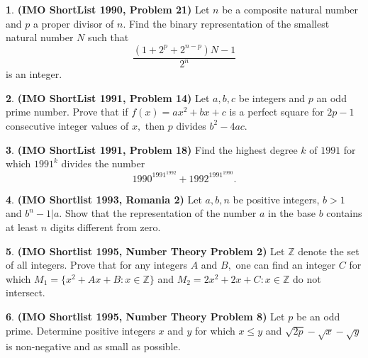 \documentclass{article}
\newcommand{\plus}{+}
\newcommand{\minus}{-}
\newcommand{\equal}{=}
\theoremstyle{definition}
\newtheorem{p}{}
\begin{document}
\begin{p}{\bf (IMO ShortList 1990, Problem 21)}
Let $ n$ be a composite natural number and $ p$ a proper divisor of $ n.$ Find the binary representation of the smallest natural number $ N$ such that 
\[ \frac{(1 \plus{} 2^p \plus{} 2^{n\minus{}p})N \minus{} 1}{2^n}\]
is an integer.
\end{p}




\begin{p}{\bf (IMO ShortList 1991, Problem 14)}
Let $ a, b, c$ be integers and $ p$ an odd prime number. Prove that if $ f(x) \equal{} ax^2 \plus{} bx \plus{} c$ is a perfect square for $ 2p \minus{} 1$ consecutive integer values of $ x,$ then $ p$ divides $ b^2 \minus{} 4ac.$
\end{p}



\begin{p}{\bf (IMO ShortList 1991, Problem 18)}
Find the highest degree $ k$ of $ 1991$ for which $ 1991^k$ divides the number \[ 1990^{1991^{1992}} \plus{} 1992^{1991^{1990}}.\]
\end{p}






\begin{p}{\bf (IMO Shortlist 1993, Romania 2)}
Let $a,b,n$ be positive integers, $b > 1$ and $b^n-1|a.$ Show that the representation of the number $a$ in the base $b$ contains at least $n$ digits different from zero.
\end{p}




\begin{p}{\bf (IMO Shortlist 1995, Number Theory Problem 2)}
Let $ \mathbb{Z}$ denote the set of all integers. Prove that for any integers $ A$ and $ B,$ one can find an integer $ C$ for which $ M_1 \equal{} \{x^2 \plus{} Ax \plus{} B : x \in \mathbb{Z}\}$ and $ M_2 \equal{} {2x^2 \plus{} 2x \plus{} C : x \in \mathbb{Z}}$ do not intersect.
\end{p}



\begin{p}{\bf (IMO Shortlist 1995, Number Theory Problem 8)}
Let $ p$ be an odd prime. Determine positive integers $ x$ and $ y$ for which $ x \leq y$ and $ \sqrt{2p} \minus{} \sqrt{x} \minus{} \sqrt{y}$ is non-negative and as small as possible.
\end{p}
\end{document}
